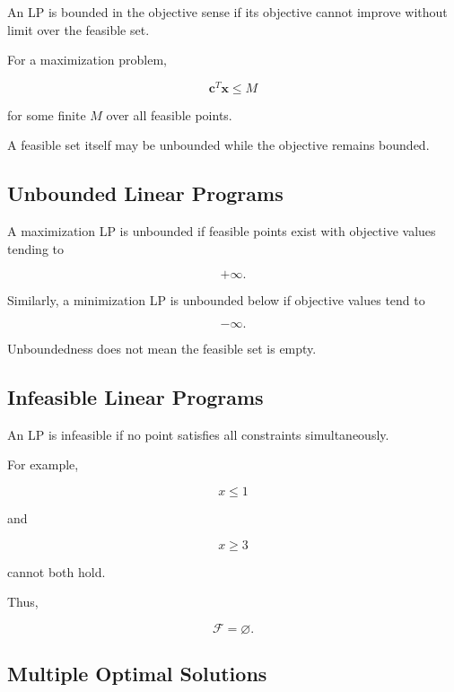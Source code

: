 An LP is bounded in the objective sense if its objective cannot improve
without limit over the feasible set.

For a maximization problem,

\[
\boxed{
\mathbf{c}^T\mathbf{x}
\leq M
}
\]

for some finite \(M\) over all feasible points.

A feasible set itself may be unbounded while the objective remains
bounded.

\subsection{Unbounded Linear Programs}
\label{subsec:unbounded-linear-programs}

A maximization LP is unbounded if feasible points exist with objective
values tending to

\[
\boxed{
+\infty.
}
\]

Similarly, a minimization LP is unbounded below if objective values tend to

\[
\boxed{
-\infty.
}
\]

Unboundedness does not mean the feasible set is empty.

\subsection{Infeasible Linear Programs}
\label{subsec:infeasible-linear-programs}

An LP is infeasible if no point satisfies all constraints simultaneously.

For example,

\[
x\leq1
\]

and

\[
x\geq3
\]

cannot both hold.

Thus,

\[
\boxed{
\mathcal{F}=\varnothing.
}
\]

\subsection{Multiple Optimal Solutions}
\label{subsec:multiple-lp-optima}

